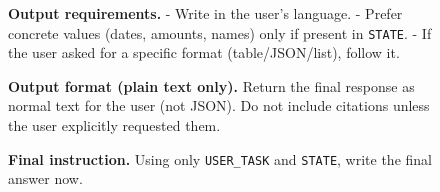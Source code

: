 \documentclass[11pt]{article}
\begin{document}
\begin{figure}[t]
\begin{promptbox}
\textbf{Output requirements.}
- Write in the user's language.
- Prefer concrete values (dates, amounts, names) only if present in \texttt{STATE}.
- If the user asked for a specific format (table/JSON/list), follow it.

\textbf{Output format (plain text only).}
Return the final response as normal text for the user (not JSON). Do not include citations unless the user explicitly requested them.

\textbf{Final instruction.} Using only \texttt{USER\_TASK} and \texttt{STATE}, write the final answer now.
\end{promptbox}
\end{figure}




\end{document}
